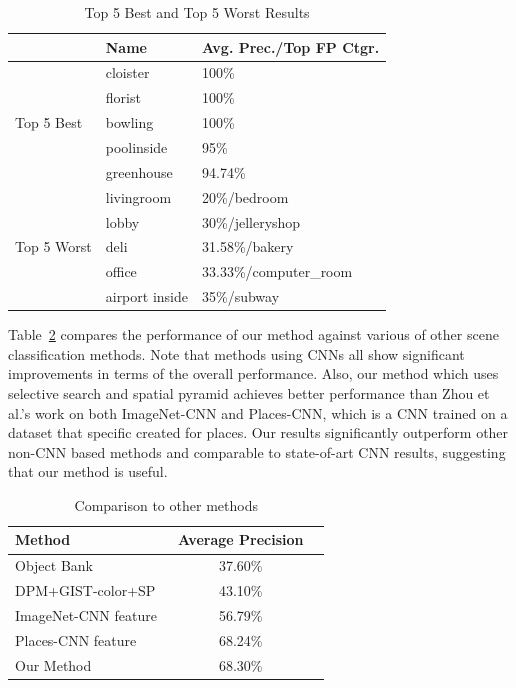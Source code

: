 \begin{table}[ht]
        \caption{Top 5 Best and Top 5 Worst Results}
        \centering
        \begin{tabular}{l l l}
        \hline \hline
        & Name           & Avg. Prec./Top FP Ctgr. \\ \hline
        \multirow{5}{*}{Top 5 Best}
        & cloister       & 100\% \\
        & florist        & 100\% \\
        & bowling        & 100\% \\
        & poolinside     & 95\% \\
        & greenhouse     & 94.74\% \\
        \hline
        \multirow{5}{*}{Top 5 Worst}
        & livingroom     & 20\%/bedroom \\
        & lobby          & 30\%/jelleryshop \\
        & deli           & 31.58\%/bakery \\
        & office         & 33.33\%/computer\_room \\
        & airport inside & 35\%/subway \\
        \hline
        \end{tabular}
        \label{tab:overall}
\end{table}

Table~\ref{tab:compare} compares the performance of our method against various
of other scene classification methods. Note that methods using CNNs all show
significant improvements in terms of the overall performance.
Also, our method which uses selective search and spatial pyramid achieves better
performance than Zhou et al.'s work on both ImageNet-CNN and Places-CNN, which
is a CNN trained on a dataset that specific created for places. Our results
significantly outperform other non-CNN based methods and comparable to 
state-of-art CNN results, suggesting that our method is useful.

\begin{table}[ht]
        \caption{Comparison to other methods}
        \centering
        \begin{tabular}{l c c}
        \hline \hline
        Method                & Average Precision \\ \hline
        Object Bank~\protect\cite{Li:2010:OBA} & 37.60\% \\
        DPM+GIST-color+SP~\protect\cite{Pandey:2011:SRW} & 43.10\% \\
        ImageNet-CNN feature~\protect\cite{Zhou:2014:LDF} & 56.79\% \\
        Places-CNN feature~\protect\cite{Zhou:2014:LDF} & 68.24\% \\
        Our Method & 68.30\% \\
        \hline
        \end{tabular}
        \label{tab:compare}
\end{table}

